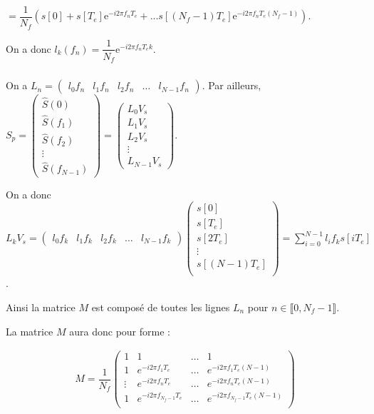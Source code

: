 \documentclass[10pt,fleqn]{article} %
\begin{document}
$= \dfrac{1}{N_f} \left(
 s\left[0\right] + 
 s\left[T_e\right] \text{e}^{-i 2 \pi f_nT_e } + ... 
 s\left[\left( N_f-1\right)T_e\right] \text{e}^{-i 2 \pi f_nT_e \left( N_f-1\right)}\right)$.
 
 On a donc $l_k\left(f_n\right)=\dfrac{1}{N_f}\text{e}^{-i 2 \pi f_nT_e k}$.
 

\subparagraph{} %

On a $L_n = \begin{pmatrix}  l_0 f_n  & l_1 f_n & l_2 f_n & \ldots & l_{N-1} f_n\end{pmatrix}$.
Par ailleurs, 
$S_p = 
\begin{pmatrix} \hat{S}\left( 0\right) \\ \hat{S}\left( f_1\right) \\ \hat{S}\left( f_2\right)  \\ \vdots \\ \hat{S}\left( f_{N-1}\right) \end{pmatrix} 
=
\begin{pmatrix} 
L_0 V_s \\
L_1 V_s \\
L_2 V_s \\
\vdots \\
 L_{N-1} V_s\end{pmatrix}$.

On a donc $ L_{k} V_s =\begin{pmatrix}  l_0 f_k  & l_1 f_k & l_2 f_k & \ldots & l_{N-1} f_k\end{pmatrix} \begin{pmatrix}
s[0]  \\ s[T_e] \\ s[2T_e] \\ \vdots \\ s\left[\left(N-1\right)T_e\right] \\   \end{pmatrix} = \sum  \limits_{i=0}^{N-1} l_i f_k s\left[i T_e\right]$.


Ainsi la matrice $M$ est composé de toutes les lignes $L_n$ pour $n\in  \llbracket 0,N_f-1\rrbracket$.

La matrice $M$ aura donc pour forme : 

\begin{align*}
M=\dfrac{1}{N_f}
\left(
\begin{array}{cccc}
1 & 1 & \ldots & 1 \\ 
1 & e^{-i2\pi f_1T_e} & \ldots & e^{-i2\pi f_{1}T_e(N-1)} \\ 
\vdots & e^{-i2\pi f_nT_e} & \ldots & e^{-i2\pi f_{n}T_e(N-1)} \\ 
1 & e^{-i2\pi f_{N_f-1}T_e} & \ldots & e^{-i2\pi f_{N_f-1}T_e(N-1)} \\ 
\end{array} 
\right)
\end{align*}
\end{document}
